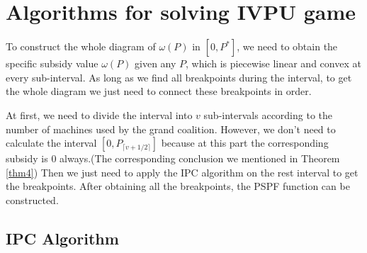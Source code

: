 \section{Algorithms for solving IVPU game}
To construct the whole diagram of $\omega(P)$ in $[0,P^*]$, we need to obtain the specific subsidy value $\omega(P)$ given any $P$, which is piecewise linear and convex at every sub-interval. As long as we find all breakpoints during the interval, to get the whole diagram we just need to connect these breakpoints in order.

At first, we need to divide the interval into $v$ sub-intervals according to the number of machines used by the grand coalition. However, we don't need to calculate the interval $[0,P_{\lceil v+1/2 \rceil}]$ because at this part the corresponding subsidy is 0 always.(The corresponding conclusion we mentioned in Theorem \ref{thm4})
Then we just need to apply the IPC algorithm on the rest interval to get the breakpoints. After obtaining all the breakpoints, the PSPF function can be constructed.

\subsection{IPC Algorithm}

